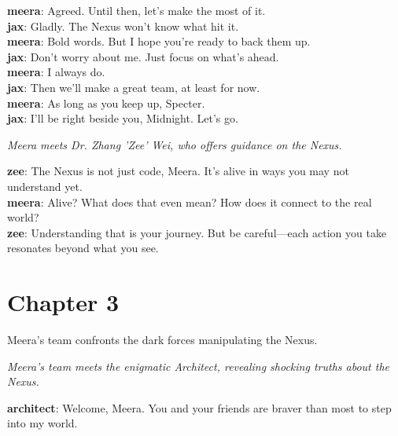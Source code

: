 \documentclass[12pt]{book}
\begin{document}
\textbf{meera}: Agreed. Until then, let's make the most of it.\\

\textbf{jax}: Gladly. The Nexus won't know what hit it.\\

\textbf{meera}: Bold words. But I hope you're ready to back them up.\\

\textbf{jax}: Don't worry about me. Just focus on what's ahead.\\

\textbf{meera}: I always do.\\

\textbf{jax}: Then we'll make a great team, at least for now.\\

\textbf{meera}: As long as you keep up, Specter.\\

\textbf{jax}: I'll be right beside you, Midnight. Let's go.\\

\vspace{1em}

\textit{Meera meets Dr. Zhang 'Zee' Wei, who offers guidance on the Nexus.}

\textbf{zee}: The Nexus is not just code, Meera. It's alive in ways you may not understand yet.\\

\textbf{meera}: Alive? What does that even mean? How does it connect to the real world?\\

\textbf{zee}: Understanding that is your journey. But be careful—each action you take resonates beyond what you see.\\

\vspace{1em}

\chapter*{Chapter 3}
Meera's team confronts the dark forces manipulating the Nexus.

\newpage

\textit{Meera's team meets the enigmatic Architect, revealing shocking truths about the Nexus.}

\textbf{architect}: Welcome, Meera. You and your friends are braver than most to step into my world.\\
\end{document}
